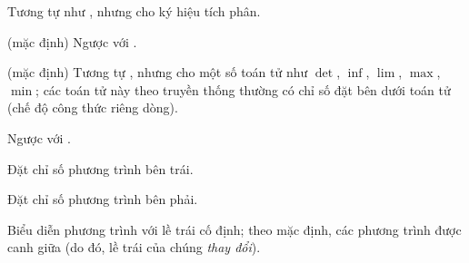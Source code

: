 \begin{lentry}
\item[\opt{intlimits}]%
Tương tự như , nhưng cho ký hiệu tích phân.

\item[\opt{nointlimits}] (mặc định)%
Ngược với .

\item[\opt{namelimits}] (mặc định)%
Tương tự , nhưng cho một số toán tử như
$\det$, $\inf$, $\lim$, $\max$, $\min$;
các toán tử này theo truyền thống thường có chỉ số đặt bên dưới toán tử
(chế độ công thức riêng dòng).

\item[\opt{nonamelimits}] Ngược với .%



\item[\opt{leqno}]%
Đặt chỉ số phương trình bên trái.

\item[\opt{reqno}]%
Đặt chỉ số phương trình bên phải.

\item[\opt{fleqn}]%
Biểu diễn phương trình với lề trái cố định; theo mặc định, các phương
trình được canh giữa (do đó, lề trái của chúng \emph{thay đổi}).
\end{lentry}

